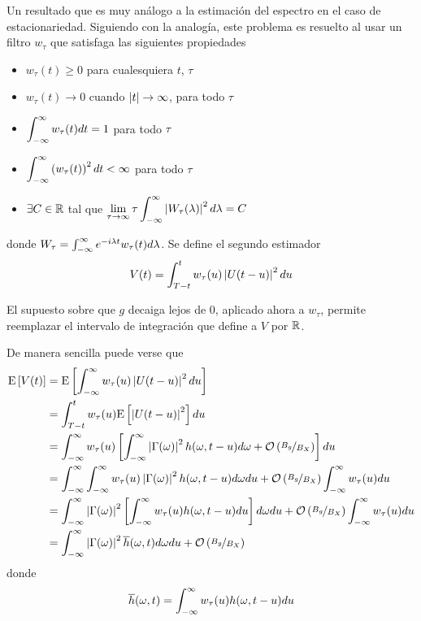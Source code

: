 Un resultado que es muy análogo a la estimación del espectro en el caso de estacionariedad.
%
Siguiendo con la analogía, este problema es resuelto al usar un filtro $w_\tau$ que satisfaga las siguientes propiedades
\begin{itemize}
\item $w_\tau(t) \geq 0$ para cualesquiera $t$, $\tau$
\item $w_\tau(t) \rightarrow 0$ cuando $\left| t \right| \rightarrow \infty$, para todo $\tau$
\item $\displaystyle \int_{-\infty}^{\infty} w_\tau(t) dt = 1$ para todo $\tau$
\item $\displaystyle \int_{-\infty}^{\infty} \left( w_\tau(t) \right)^{2} dt < \infty$ para todo $\tau$
\item $\exists C \in \mathbb{R}$ tal que  
$\displaystyle \lim_{\tau\rightarrow\infty} \tau \int_{-\infty}^{\infty} \left|  W_{\tau}(\lambda)  \right|^{2} d\lambda = C$
\end{itemize}
donde $W_\tau = \int_{-\infty}^{\infty} e^{-i \lambda t} w_\tau(t) d\lambda$. Se define el segundo estimador
\begin{equation}
V(t) = \int_{T-t}^{t} w_\tau (u) \left| U(t-u) \right|^{2} du
\label{estimador_doble_ventana}
\end{equation}

El supuesto sobre que $g$ decaiga lejos de 0, aplicado ahora a $w_\tau$, permite reemplazar el intervalo de integración que define a $V$ por $\mathbb{R}$. 

De manera sencilla puede verse que
\begin{align*}
\mathrm{E}\left[ V(t) \right] &= 
\mathrm{E}\left[ \int_{-\infty}^{\infty} w_\tau (u) \left| U(t-u) \right|^{2} du \right] \\
&= 
\int_{T-t}^{t} w_\tau (u) \mathrm{E}\left[ \left| U(t-u) \right|^{2} \right] du \\
&=
\int_{-\infty}^{\infty} w_\tau (u) \left[
\int_{-\infty}^{\infty} \left| \Gamma(\omega) \right|^{2} h(\omega, t-u)d\omega + \mathcal{O}\left( \nicefrac{B_g}{B_X} \right) \right] du \\
&=
\int_{-\infty}^{\infty} \int_{-\infty}^{\infty} w_\tau (u) \left| \Gamma(\omega) \right|^{2} h(\omega, t-u)d\omega du +
\mathcal{O}\left( \nicefrac{B_g}{B_X} \right) \int_{-\infty}^{\infty} w_\tau (u) du \\
&=
\int_{-\infty}^{\infty} \left| \Gamma(\omega) \right|^{2} \left[ \int_{-\infty}^{\infty} w_\tau (u) h(\omega, t-u) du \right] d\omega du +
\mathcal{O}\left( \nicefrac{B_g}{B_X} \right) \int_{-\infty}^{\infty} w_\tau (u) du \\
&=
\int_{-\infty}^{\infty} \left| \Gamma(\omega) \right|^{2} \overline{h}(\omega,t) d\omega du +
\mathcal{O}\left( \nicefrac{B_g}{B_X} \right) \\
\end{align*}
donde
\begin{equation}
\overline{h}(\omega,t) = \int_{-\infty}^{\infty} w_\tau (u) h(\omega, t-u) du
\end{equation}

